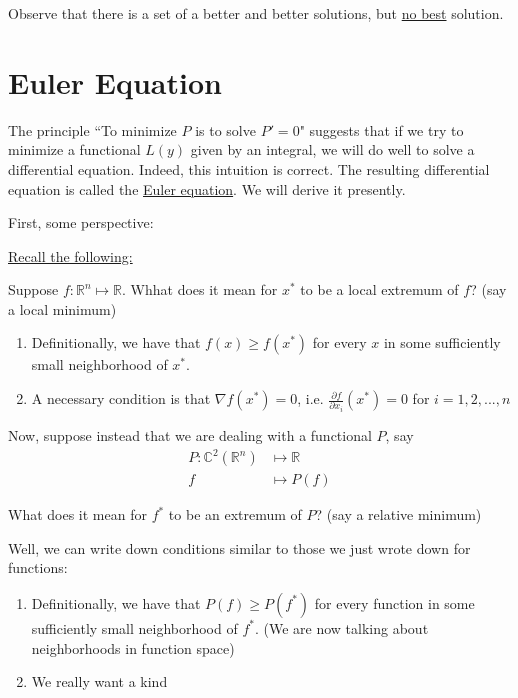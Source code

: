 Observe that there is a set of a better and better solutions, but \underline{no best} solution. 

\section{Euler Equation}
\label{section:euler_equation}

The principle ``To minimize $P$ is to solve $P' = 0 $" suggests that if we try to minimize a functional $L(y)$ given by an integral, we will do well to solve a differential equation. 
Indeed, this intuition is correct. 
The resulting differential equation is called the \underline{Euler equation}. 
We will derive it presently. 

\noindent First, some perspective:

\underline{Recall the following:}

Suppose $f: \mathbb{R}^n \mapsto \mathbb{R}$. Whhat does it mean for $x^*$ to be a local extremum of $f$? (say a local minimum)

\begin{enumerate}
    \item Definitionally, we have that $f(x) \geq f(x^*)$ for every $x$ in some sufficiently small neighborhood of $x^*$. 
    
    \item A necessary condition is that $\nabla f(x^*) = 0$, i.e. $\frac{\partial f}{\partial x_i} (x^*) = 0$ for $i = 1, 2, ... , n$
\end{enumerate}


Now, suppose instead that we are dealing with a functional $P$, say
\begin{align*}
    P: \mathbb{C}^2(\mathbb{R}^n) &\mapsto \mathbb{R}\\
    f &\mapsto P(f)
\end{align*}

What does it mean for $f^*$ to be an extremum of $P$? (say a relative minimum)

Well, we can write down conditions similar to those we just wrote down for functions:

\begin{enumerate}
    \item Definitionally, we have that $P(f) \geq P(f^*)$ for every function in some sufficiently small neighborhood of $f^*$. (We are now talking about neighborhoods in function space) 
    
    \item We really want a kind 
\end{enumerate}